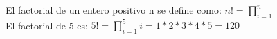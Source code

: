 \documentclass{article}
\begin{document}
	 El factorial de un entero positivo n se define como: $n! = \prod_{i=1}^{n}$ \\
	 El factorial de 5 es: $5! = \prod_{i=1}^{5}i = 1 * 2 * 3 * 4 * 5 = 120$ 
\end{document}
